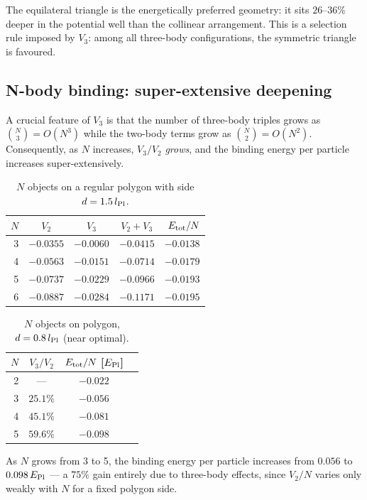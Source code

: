 \noindent
The equilateral triangle is the energetically preferred geometry: it
sits $26$--$36\%$ deeper in the potential well than the collinear
arrangement.  This is a selection rule imposed by $V_3$: among all
three-body configurations, the symmetric triangle is favoured.

\subsection{N-body binding: super-extensive deepening}

A crucial feature of $V_3$ is that the number of three-body triples
grows as $\binom{N}{3} = O(N^3)$ while the two-body terms grow as
$\binom{N}{2} = O(N^2)$.  Consequently, as $N$ increases, $V_3/V_2$
\emph{grows}, and the binding energy per particle increases
super-extensively.

\begin{table}[h]
\centering
\caption{$N$ objects on a regular polygon with side $d=1.5\,l_{\rm Pl}$.}
\label{tab:Npoly_d15}
\begin{tabular}{rcccr}
\hline
$N$ & $V_2$ & $V_3$ & $V_2+V_3$ & $E_{\rm tot}/N$ \\
\hline
3 & $-0.0355$ & $-0.0060$ & $-0.0415$ & $-0.0138$ \\
4 & $-0.0563$ & $-0.0151$ & $-0.0714$ & $-0.0179$ \\
5 & $-0.0737$ & $-0.0229$ & $-0.0966$ & $-0.0193$ \\
6 & $-0.0887$ & $-0.0284$ & $-0.1171$ & $-0.0195$ \\
\hline
\end{tabular}
\end{table}

\begin{table}[h]
\centering
\caption{$N$ objects on polygon, $d=0.8\,l_{\rm Pl}$ (near optimal).}
\label{tab:Npoly_d08}
\begin{tabular}{rccc}
\hline
$N$ & $V_3/V_2$ & $E_{\rm tot}/N$ [$E_{\rm Pl}$] \\
\hline
2 & --- & $-0.022$ \\
3 & $25.1\%$ & $-0.056$ \\
4 & $45.1\%$ & $-0.081$ \\
5 & $59.6\%$ & $-0.098$ \\
\hline
\end{tabular}
\end{table}

\noindent
As $N$ grows from 3 to 5, the binding energy per particle increases
from $0.056$ to $0.098\,E_{\rm Pl}$ — a $75\%$ gain entirely due to
three-body effects, since $V_2/N$ varies only weakly with $N$ for a
fixed polygon side.

